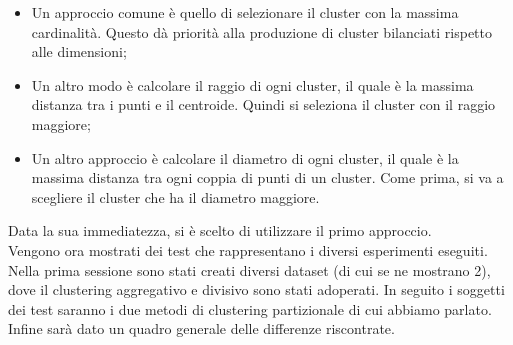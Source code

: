 \documentclass{llncs}
\newcommand{\acapo}{\vspace{0.5\baselineskip}\\}
\begin{document}
	\begin{itemize}
		\item Un approccio comune è quello di selezionare il cluster con la massima cardinalità. Questo dà priorità alla produzione di cluster bilanciati rispetto alle dimensioni;
	
		\item Un altro modo è calcolare il raggio di ogni cluster, il quale è la massima distanza tra i punti e il centroide. Quindi si seleziona il cluster con il raggio maggiore;
			
		\item Un altro approccio è calcolare il diametro di ogni cluster, il quale è la massima distanza tra ogni coppia di punti di un cluster.
			Come prima, si va a scegliere il cluster che ha il diametro maggiore.
	\end{itemize}
	
	Data la sua immediatezza, si è scelto di utilizzare il primo approccio.
	\acapo
	Vengono ora mostrati dei test che rappresentano i diversi esperimenti eseguiti. Nella prima sessione sono stati creati diversi dataset (di cui se ne mostrano 2), dove il clustering 
	aggregativo e divisivo sono stati adoperati. In seguito i soggetti dei test saranno i due metodi di clustering partizionale di cui abbiamo parlato. Infine sarà dato un quadro
	generale delle differenze riscontrate.
	
	\clearpage
\end{document}
